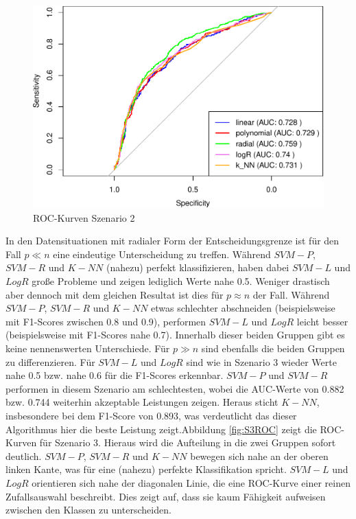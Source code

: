 \documentclass[
]{article}
\begin{document}
\begin{figure}

{\centering \includegraphics{Ergebnisse_files/figure-latex/S2ROC-1} 

}

\caption{ROC-Kurven Szenario 2}\label{fig:S2ROC}
\end{figure}

In den Datensituationen mit radialer Form der Entscheidungsgrenze ist
für den Fall \(p \ll n\) eine eindeutige Unterscheidung zu treffen.
Während \(SVM-P\), \(SVM-R\) und \(K-NN\) (nahezu) perfekt
klassifizieren, haben dabei \(SVM-L\) und \(LogR\) große Probleme und
zeigen lediglich Werte nahe 0.5. Weniger drastisch aber dennoch mit dem
gleichen Resultat ist dies für \(p \approx n\) der Fall. Während
\(SVM-P\), \(SVM-R\) und \(K-NN\) etwas schlechter abschneiden
(beispielsweise mit F1-Scores zwischen 0.8 und 0.9), performen \(SVM-L\)
und \(LogR\) leicht besser (beispielsweise mit F1-Scores nahe 0.7).
Innerhalb dieser beiden Gruppen gibt es keine nennenswerten
Unterschiede. Für \(p \gg n\) sind ebenfalls die beiden Gruppen zu
differenzieren. Für \(SVM-L\) und \(LogR\) sind wie in Szenario 3 wieder
Werte nahe 0.5 bzw. nahe 0.6 für die F1-Scores erkennbar. \(SVM-P\) und
\(SVM-R\) performen in diesem Szenario am schlechtesten, wobei die
AUC-Werte von 0.882 bzw. 0.744 weiterhin akzeptable Leistungen zeigen.
Heraus sticht \(K-NN\), insbesondere bei dem F1-Score von 0.893, was
verdeutlicht das dieser Algorithmus hier die beste Leistung
zeigt.\newline Abbildung \ref{fig:S3ROC} zeigt die ROC-Kurven für
Szenario 3. Hieraus wird die Aufteilung in die zwei Gruppen sofort
deutlich. \(SVM-P\), \(SVM-R\) und \(K-NN\) bewegen sich nahe an der
oberen linken Kante, was für eine (nahezu) perfekte Klassifikation
spricht. \(SVM-L\) und \(LogR\) orientieren sich nahe der diagonalen
Linie, die eine ROC-Kurve einer reinen Zufallsauswahl beschreibt. Dies
zeigt auf, dass sie kaum Fähigkeit aufweisen zwischen den Klassen zu
unterscheiden.
\end{document}
